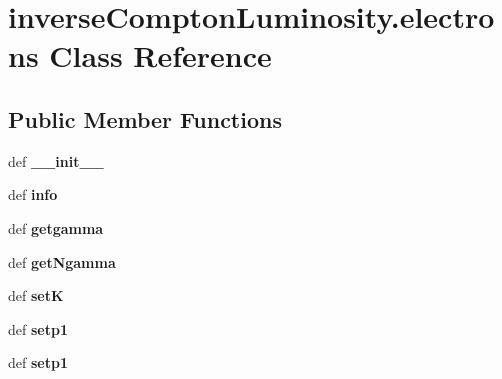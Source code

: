 \hypertarget{classinverseComptonLuminosity_1_1electrons}{\section{inverse\-Compton\-Luminosity.\-electrons Class Reference}
\label{classinverseComptonLuminosity_1_1electrons}
}
\subsection*{Public Member Functions}
\begin{DoxyCompactItemize}
\item 
\hypertarget{classinverseComptonLuminosity_1_1electrons_a69a81c0f2799a740d738a9bfd8489ddb}{def {\bfseries \-\_\-\-\_\-init\-\_\-\-\_\-}}\label{classinverseComptonLuminosity_1_1electrons_a69a81c0f2799a740d738a9bfd8489ddb}

\item 
\hypertarget{classinverseComptonLuminosity_1_1electrons_ac92e162a448f65a8fb7e6558d91fcb2f}{def {\bfseries info}}\label{classinverseComptonLuminosity_1_1electrons_ac92e162a448f65a8fb7e6558d91fcb2f}

\item 
\hypertarget{classinverseComptonLuminosity_1_1electrons_a05bce5fcd17ebd4f2220238a423f5efd}{def {\bfseries getgamma}}\label{classinverseComptonLuminosity_1_1electrons_a05bce5fcd17ebd4f2220238a423f5efd}

\item 
\hypertarget{classinverseComptonLuminosity_1_1electrons_a4c9610721952ae458ff42d97b7e604cd}{def {\bfseries get\-Ngamma}}\label{classinverseComptonLuminosity_1_1electrons_a4c9610721952ae458ff42d97b7e604cd}

\item 
\hypertarget{classinverseComptonLuminosity_1_1electrons_afa28d407c9ede3777d514af0a3ef8bf7}{def {\bfseries set\-K}}\label{classinverseComptonLuminosity_1_1electrons_afa28d407c9ede3777d514af0a3ef8bf7}

\item 
\hypertarget{classinverseComptonLuminosity_1_1electrons_afa6f19f8329b02fad95e8d9ed167e4db}{def {\bfseries setp1}}\label{classinverseComptonLuminosity_1_1electrons_afa6f19f8329b02fad95e8d9ed167e4db}

\item 
\hypertarget{classinverseComptonLuminosity_1_1electrons_afa6f19f8329b02fad95e8d9ed167e4db}{def {\bfseries setp1}}\label{classinverseComptonLuminosity_1_1electrons_afa6f19f8329b02fad95e8d9ed167e4db}


\end{DoxyCompactItemize}
